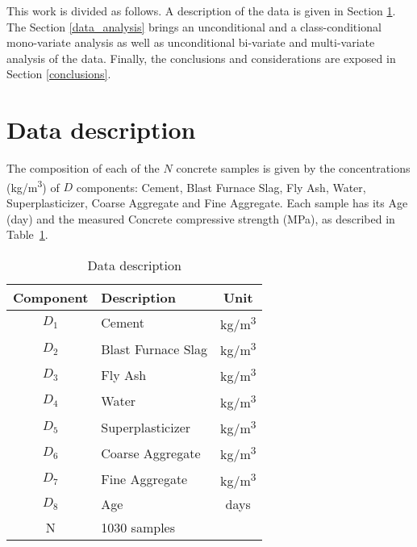 \documentclass[conference]{IEEEtran}
\begin{document}
This work is divided as follows. A description of the data is given in Section \ref{data_description}. The Section \ref{data_analysis} brings an unconditional and a class-conditional mono-variate analysis as well as unconditional bi-variate and multi-variate analysis of the data. Finally, the conclusions and considerations are exposed in Section \ref{conclusions}.


\section{Data description}\label{data_description}

The composition of each of the $N$ concrete samples is given by the concentrations (kg/m\textsuperscript{3}) of $D$ components: Cement, Blast Furnace Slag, Fly Ash, Water, Superplasticizer, Coarse Aggregate and Fine Aggregate. Each sample has its Age (day) and the measured Concrete compressive strength (MPa), as described in Table~\ref{data_description_table}.

\begin{table}[htp]
\caption{Data description}
\begin{center}
  \begin{tabular}{@{} clc @{}}
    \toprule
    Component & Description & Unit \\ 
    \midrule
    $D_1$ & Cement & kg/m\textsuperscript{3} \\ 
    $D_2$ & Blast Furnace Slag & kg/m\textsuperscript{3} \\ 
    $D_3$ & Fly Ash & kg/m\textsuperscript{3} \\ 
    $D_4$ & Water & kg/m\textsuperscript{3} \\ 
    $D_5$ & Superplasticizer & kg/m\textsuperscript{3} \\ 
    $D_6$ & Coarse Aggregate & kg/m\textsuperscript{3} \\ 
    $D_7$ & Fine Aggregate & kg/m\textsuperscript{3} \\ 
    $D_8$ & Age & days \\ 
	\midrule
    N & 1030 samples&  \\ 
    \bottomrule
  \end{tabular}
\end{center}
\label{data_description_table}
\end{table}%
\end{document}
